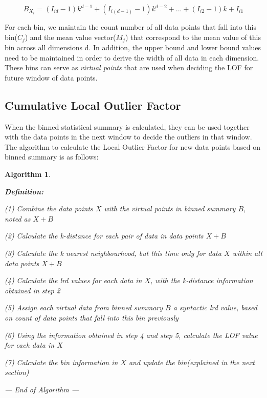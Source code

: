 \documentclass[11pt]{article}       %
\newtheorem{algX}{Algorithm}
\newenvironment{algorithm}       {\begin{algX}\begin{em}}%
                                 {\par\noindent --- End of Algorithm ---
                                 \end{em}\end{algX}}
\newcommand{\step}[2]            {\begin{list}{}
                                  {  \setlength{\topsep}{0cm}
                                     \setlength{\partopsep}{0cm}
                                     \setlength{\leftmargin}{0.8cm}
                                     \setlength{\labelwidth}{0.7cm}
                                     \setlength{\labelsep}{0.1cm}    }
                                  \item[#1]#2    \end{list}}
\begin{document}
\[ B_{X_{i}} = (I_{id} - 1)k^{d-1} + (I_{i(d-1)} - 1)k^{d-2} + ... + (I_{i2} -1)k + I_{i1} \]

For each bin, we maintain the count number of all data points that fall into this bin($C_j$) and the mean value vector($M_j$) that correspond to the mean value of this bin across all dimensions d. In addition, the upper bound and lower bound values need to be maintained in order to derive the width of all data in each dimension. These bins can serve as \textit{virtual points} that are used when deciding the LOF for future window of data points.

\subsection{Cumulative Local Outlier Factor} \label{subsect3}

When the binned statistical summary is calculated, they can be used together with the data points in the next window to decide the outliers in that window. The algorithm to calculate the Local Outlier Factor for new data points based on binned summary is as follows:

\begin{algorithm} 
	\label{LOF_GPU} \textbf{Definition:}
       	\step{(1)}{Combine the data points $X$ with the virtual points in binned summary $B$, noted as $X + B$}
	\step{(2)}{Calculate the k-distance for each pair of data in data points $X + B$}
	\step{(3)}{Calculate the k nearest neighbourhood, but this time only for data $X$ within all data points $X + B$}
	\step{(4)}{Calculate the lrd values for each data in $X$, with the k-distance information obtained in step 2}
	\step{(5)}{Assign each virtual data from binned summary $B$ a syntactic lrd value, based on count of data points that fall into this bin previously}
	\step{(6)}{Using the information obtained in step 4 and step 5, calculate the LOF value for each data in $X$}
	\step{(7)}{Calculate the bin information in $X$ and update the bin(explained in the next section)}
\end{algorithm}
\end{document}
